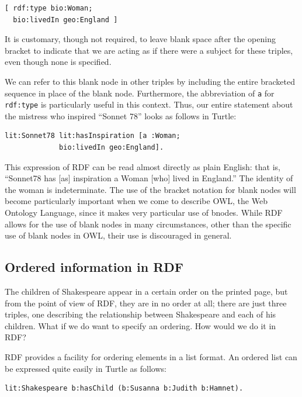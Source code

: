 \begin{lstlisting}
[ rdf:type bio:Woman;
  bio:livedIn geo:England ]
\end{lstlisting}

It is customary, though not required, to leave blank space after the
opening bracket to indicate that we are acting as if there were a
subject for these triples, even though none is specified.

We can refer to this blank node in other triples by including the entire
bracketed sequence in place of the blank node. Furthermore, the
abbreviation of \texttt{a} for \texttt{rdf:type} is particularly useful in this
context. Thus, our entire statement about the mistress who inspired
``Sonnet 78'' looks as follows in Turtle:

\begin{lstlisting}
lit:Sonnet78 lit:hasInspiration [a :Woman;
             bio:livedIn geo:England].
\end{lstlisting}

This expression of RDF can be read almost directly as plain English:
that is, ``Sonnet78 has {[}as{]} inspiration a Woman {[}who{]} lived in
England.'' The identity of the woman is indeterminate. The use of the
bracket notation for blank nodes will become particularly important when
we come to describe OWL, the Web Ontology Language, since it makes very
particular use of bnodes. While RDF allows for the use of blank nodes in
many circumstances, other than the specific use of blank nodes in OWL,
their use is discouraged in general.

\subsection{Ordered information in RDF\label{ordered}}

The children of Shakespeare appear in a certain order on the printed
page, but from the point of view of RDF, they are in no order at all;
there are just three triples, one describing the relationship between
Shakespeare and each of his children. What if we do want to specify an
ordering. How would we do it in RDF?

RDF provides a facility for ordering elements in a list format. An
ordered list can be expressed quite easily in Turtle as follows:

\begin{lstlisting}
lit:Shakespeare b:hasChild (b:Susanna b:Judith b:Hamnet).
\end{lstlisting}

